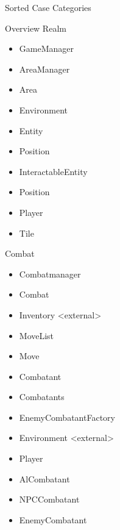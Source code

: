 \documentclass[12pt]{article}
\begin{document}
\begin{section}{Sorted Case Categories}
\begin{subsection}{Overview Realm}
\begin{itemize}
\item GameManager
\item AreaManager
\item Area
\item Environment
\item Entity
\item Position
\item InteractableEntity
\item Position
\item Player
\item Tile



\end{itemize}
\end{subsection}

\begin{subsection}{Combat}
\begin{itemize}
\item Combatmanager
\item Combat
\item Inventory <external>
\item MoveList
\item Move
\item Combatant
\item Combatants
\item EnemyCombatantFactory
\item Environment <external>
\item Player
\item AlCombatant
\item NPCCombatant
\item EnemyCombatant
\end{itemize}
\end{subsection}
\end{section}
\end{document}

